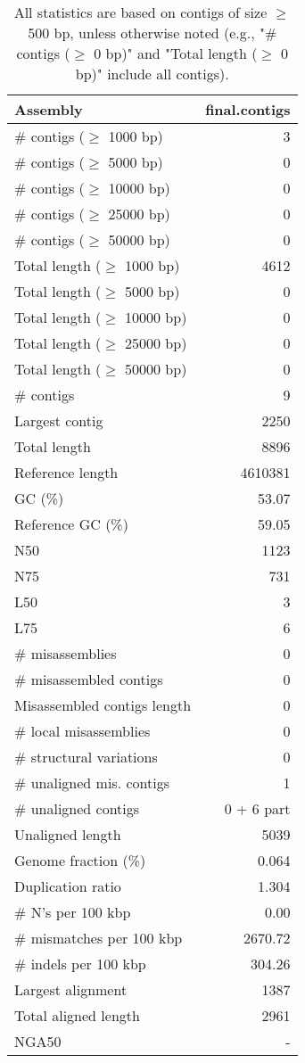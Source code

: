 \documentclass[12pt,a4paper]{article}
\begin{document}
\begin{table}[ht]
\begin{center}
\caption{All statistics are based on contigs of size $\geq$ 500 bp, unless otherwise noted (e.g., "\# contigs ($\geq$ 0 bp)" and "Total length ($\geq$ 0 bp)" include all contigs).}
\begin{tabular}{|l*{1}{|r}|}
\hline
Assembly & final.contigs \\ \hline
\# contigs ($\geq$ 1000 bp) & 3 \\ \hline
\# contigs ($\geq$ 5000 bp) & 0 \\ \hline
\# contigs ($\geq$ 10000 bp) & 0 \\ \hline
\# contigs ($\geq$ 25000 bp) & 0 \\ \hline
\# contigs ($\geq$ 50000 bp) & 0 \\ \hline
Total length ($\geq$ 1000 bp) & 4612 \\ \hline
Total length ($\geq$ 5000 bp) & 0 \\ \hline
Total length ($\geq$ 10000 bp) & 0 \\ \hline
Total length ($\geq$ 25000 bp) & 0 \\ \hline
Total length ($\geq$ 50000 bp) & 0 \\ \hline
\# contigs & 9 \\ \hline
Largest contig & 2250 \\ \hline
Total length & 8896 \\ \hline
Reference length & 4610381 \\ \hline
GC (\%) & 53.07 \\ \hline
Reference GC (\%) & 59.05 \\ \hline
N50 & 1123 \\ \hline
N75 & 731 \\ \hline
L50 & 3 \\ \hline
L75 & 6 \\ \hline
\# misassemblies & 0 \\ \hline
\# misassembled contigs & 0 \\ \hline
Misassembled contigs length & 0 \\ \hline
\# local misassemblies & 0 \\ \hline
\# structural variations & 0 \\ \hline
\# unaligned mis. contigs & 1 \\ \hline
\# unaligned contigs & 0 + 6 part \\ \hline
Unaligned length & 5039 \\ \hline
Genome fraction (\%) & 0.064 \\ \hline
Duplication ratio & 1.304 \\ \hline
\# N's per 100 kbp & 0.00 \\ \hline
\# mismatches per 100 kbp & 2670.72 \\ \hline
\# indels per 100 kbp & 304.26 \\ \hline
Largest alignment & 1387 \\ \hline
Total aligned length & 2961 \\ \hline
NGA50 & - \\ \hline
\end{tabular}
\end{center}
\end{table}
\end{document}
